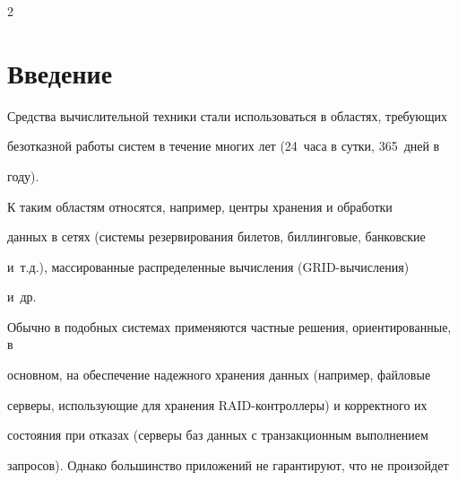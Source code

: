\begin{multicols}{2}



\section{Введение}



{\nwt



Средства вычислительной техники стали использоваться в областях, требующих 

безотказной работы систем в течение многих лет (24~часа в сутки, 365~дней в 

году).



\label{st\stat}



{\renewcommand{\thefootnote}{\fnsymbol{footnote}}  

\renewcommand{\thefootnote}{\arabic{footnote}}}

  



К таким областям относятся, например, центры хранения и обработки

данных  в сетях (системы резервирования билетов, биллинговые,  банковские

и~т.д.), массированные распределенные вы\-чис\-ле\-ния (GRID-вычисления)

и~др.



\thispagestyle{headings}



Обычно в подобных системах применяются частные решения, ориентированные, в 

основном, на обеспечение надежного хранения данных (напри\-мер, файловые 

серверы, ис\-поль\-зу\-ющие для хранения RAID-контроллеры) и корректного их 

состояния при отказах (серверы баз данных с транзакционным выполнением 

запросов). Однако большинство приложений не гарантируют, что не произойдет 

}
\end{multicols}
